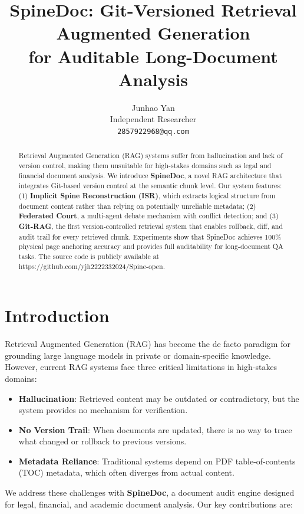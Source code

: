 \documentclass[11pt]{article}
\title{SpineDoc: Git-Versioned Retrieval Augmented Generation \\ for Auditable Long-Document Analysis}
\author{
  Junhao Yan \\
  Independent Researcher \\
  \texttt{2857922968@qq.com} \\
}
\date{}
\begin{document}
\maketitle

\begin{abstract}
Retrieval Augmented Generation (RAG) systems suffer from hallucination and lack of version control, making them unsuitable for high-stakes domains such as legal and financial document analysis. We introduce \textbf{SpineDoc}, a novel RAG architecture that integrates Git-based version control at the semantic chunk level. Our system features: (1) \textbf{Implicit Spine Reconstruction (ISR)}, which extracts logical structure from document content rather than relying on potentially unreliable metadata; (2) \textbf{Federated Court}, a multi-agent debate mechanism with conflict detection; and (3) \textbf{Git-RAG}, the first version-controlled retrieval system that enables rollback, diff, and audit trail for every retrieved chunk. Experiments show that SpineDoc achieves 100\% physical page anchoring accuracy and provides full auditability for long-document QA tasks. The source code is publicly available at https://github.com/yjh2222332024/Spine-open.
\end{abstract}

\section{Introduction}

Retrieval Augmented Generation (RAG) has become the de facto paradigm for grounding large language models in private or domain-specific knowledge. However, current RAG systems face three critical limitations in high-stakes domains:

\begin{itemize}
    \item \textbf{Hallucination}: Retrieved content may be outdated or contradictory, but the system provides no mechanism for verification.
    \item \textbf{No Version Trail}: When documents are updated, there is no way to trace what changed or rollback to previous versions.
    \item \textbf{Metadata Reliance}: Traditional systems depend on PDF table-of-contents (TOC) metadata, which often diverges from actual content.
\end{itemize}

We address these challenges with \textbf{SpineDoc}, a document audit engine designed for legal, financial, and academic document analysis. Our key contributions are:
\end{document}

